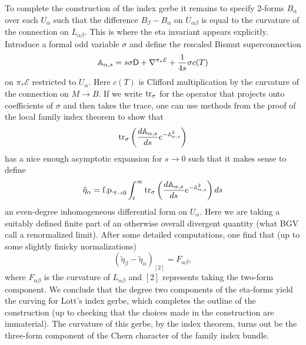 \documentclass{amsart}
\renewcommand\d{\mathsf{D}}
\begin{document}
\begin{example}
    To complete the construction of the index gerbe it remains to specify 2-forms
    $B_\alpha$ over each $U_\alpha$ such that the difference $B_\beta-B_\alpha$ on
    $U_{\alpha\beta}$ is equal to the curvature of the connection on $L_{\alpha\beta}$.
    This is where the eta invariant appears explicitly. Introduce a formal odd variable
    $\sigma$ and define the rescaled Bismut superconnection
    \begin{equation*}
        \A_{\alpha,s} = s\sigma \d + \nabla^{\pi_*\mathcal{E}} + \frac{1}{4s} \sigma c(T)
    \end{equation*}
    on $\pi_*\mathcal{E}$ restricted to $U_\alpha$. Here $c(T)$ is Clifford multiplication
    by the curvature of the connection on $M\to B$. If we write $\operatorname{tr}_\sigma$ for the
    operator that projects onto coefficients of $\sigma$ and then takes the trace,
    one can use methods from the proof of the local family index theorem to show that
    \begin{equation*}
        \operatorname{tr}_\sigma\left( \frac{d\mathbb{A}_{\alpha,s}}{ds}e^{-\mathbb{A}^2_{\alpha,s}} \right)
    \end{equation*}
    has a nice enough asymptotic expansion for $s\to 0$ such that it makes sense to define
    \begin{equation*}
        \tilde \eta_\alpha = \text{f.p.}_{t\to 0}\int_t^\infty\operatorname{tr}_{\sigma}\left( \frac{d\mathbb{A}_{\alpha,s}}{ds}e^{-\mathbb{A}^2_{\alpha,s}} \right) ds
    \end{equation*}
    an even-degree inhomogeneous differential form on $U_\alpha$. Here we are taking
    a suitably defined finite part of an otherwise overall divergent quantity (what
    BGV call a renormalized limit). After some detailed computations, one find that
    (up to some slightly finicky normalizations)
    \begin{equation*}
        (\tilde \eta_\beta - \tilde \eta_\alpha)_{[2]} = F_{\alpha\beta},
    \end{equation*}
    where $F_{\alpha\beta}$ is the curvature of $L_{\alpha\beta}$ and $[2]$ represents
    taking the two-form component. We conclude that the degree two components of the
    eta-forms yield the curving for Lott's index gerbe, which completes the outline of the
    construction (up to checking that the choices made in the construction are
    immaterial). The curvature of this gerbe, by the index theorem, turns out be the
    three-form component of the Chern character of the family index bundle.
\end{example}
\end{document}
